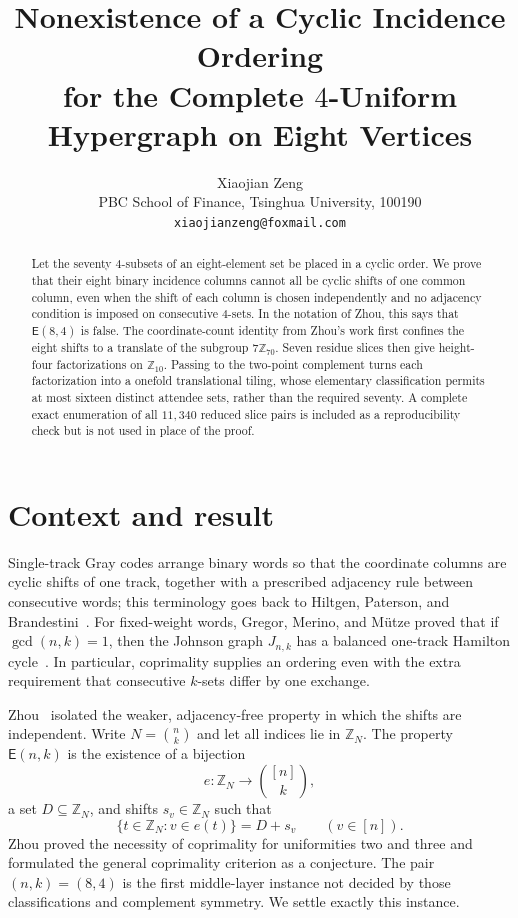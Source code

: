 \documentclass[11pt]{article}
\title{Nonexistence of a Cyclic Incidence Ordering\\
for the Complete $4$-Uniform Hypergraph on Eight Vertices}
\author{Xiaojian Zeng\\
PBC School of Finance, Tsinghua University, 100190\\
\texttt{xiaojianzeng@foxmail.com}}
\date{}
\newcommand{\Z}{\mathbb Z}
\begin{document}
\maketitle

\begin{abstract}
Let the seventy $4$-subsets of an eight-element set be placed in a cyclic
order.  We prove that their eight binary incidence columns cannot all be
cyclic shifts of one common column, even when the shift of each column is
chosen independently and no adjacency condition is imposed on consecutive
$4$-sets.  In the notation of Zhou, this says that $\mathsf E(8,4)$ is false.
The coordinate-count identity from Zhou's work first confines the eight
shifts to a translate of the subgroup $7\Z_{70}$.  Seven residue slices then
give height-four factorizations on $\Z_{10}$.  Passing to the two-point
complement turns each factorization into a onefold translational tiling, whose
elementary classification permits at most sixteen distinct attendee sets,
rather than the required seventy.  A complete exact enumeration of
all $11{,}340$ reduced slice pairs is included as a reproducibility check but
is not used in place of the proof.
\end{abstract}

\section{Context and result}

Single-track Gray codes arrange binary words so that the coordinate columns
are cyclic shifts of one track, together with a prescribed adjacency rule
between consecutive words; this terminology goes back to Hiltgen, Paterson,
and Brandestini~\cite{hiltgen1996}.  For fixed-weight words, Gregor, Merino,
and M\"utze proved that if $\gcd(n,k)=1$, then the Johnson graph $J_{n,k}$ has
a balanced one-track Hamilton cycle~\cite[Theorem~4.5]{gregor2024}.  In
particular, coprimality supplies an ordering even with the extra requirement
that consecutive $k$-sets differ by one exchange.

Zhou~\cite{zhou2026} isolated the weaker, adjacency-free property in which
the shifts are independent.  Write $N=\binom nk$ and let all indices lie in
$\Z_N$.  The property $\mathsf E(n,k)$ is the existence of a bijection
\[
 e:\Z_N\longrightarrow \binom{[n]}k,
\]
a set $D\subseteq\Z_N$, and shifts $s_v\in\Z_N$ such that
\[
 \{t\in\Z_N:v\in e(t)\}=D+s_v\qquad(v\in[n]).             \tag{1}
\]
Zhou proved the necessity of coprimality for uniformities two and three and
formulated the general coprimality criterion as a conjecture.  The pair
$(n,k)=(8,4)$ is the first middle-layer instance not decided by those
classifications and complement symmetry.  We settle exactly this instance.
\end{document}
